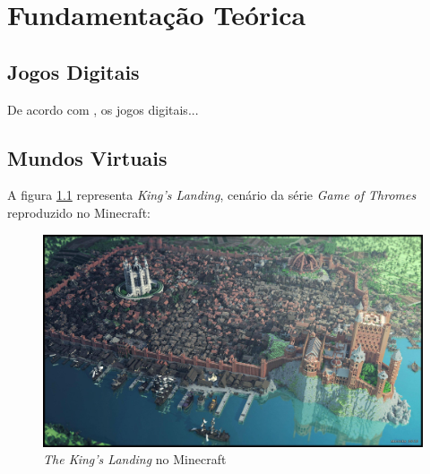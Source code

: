 \chapter{Fundamentação Teórica}

\lipsum[1-2]

\begin{citacao}
\lipsum[1]\cite[p. ~34]{Huizinga2014}
\end{citacao}

\section{Jogos Digitais}

De acordo com , os jogos digitais...

\lipsum[4-7]

\section{Mundos Virtuais}

\lipsum[8-9]

A figura \ref{fig:kings-landing} representa \emph{King's Landing}, cenário da série \emph{Game of Thromes} reproduzido no Minecraft:

\begin{figure}[h]
	\caption{\emph{The King's Landing} no Minecraft}
	\center
	\label{fig:kings-landing}
	\includegraphics[scale=0.15]{fundamentacao/kings-landing.jpg}
\end{figure}

\lipsum[10-12]

